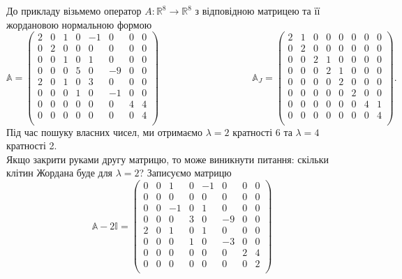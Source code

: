 \documentclass{math_library}
\begin{document}
\begin{example}
До прикладу візьмемо оператор $A \colon \mathbb{R}^8 \to \mathbb{R}^8$ з відповідною матрицею та її жордановою нормальною формою
\[
\mathbb{A} = \begin{pmatrix}
2 & 0 & 1 & 0 & -1 & 0 & 0 & 0 \\
0 & 2 & 0 & 0 & 0 & 0 & 0 & 0 \\
0 & 0 & 1 & 0 & 1 & 0 & 0 & 0 \\
0 & 0 & 0 & 5 & 0 & -9 & 0 & 0 \\
2 & 0 & 1 & 0 & 3 & 0 & 0 & 0 \\
0 & 0 & 0 & 1 & 0 & -1 & 0 & 0 \\
0 & 0 & 0 & 0 & 0 & 0 & 4 & 4 \\
0 & 0 & 0 & 0 & 0 & 0 & 0 & 4 \\
\end{pmatrix} \hspace{4cm} \mathbb{A}_J = \begin{pmatrix}
2 & 1 & 0 & 0 & 0 & 0 & 0 & 0 \\
0 & 2 & 0 & 0 & 0 & 0 & 0 & 0 \\
0 & 0 & 2 & 1 & 0 & 0 & 0 & 0 \\
0 & 0 & 0 & 2 & 1 & 0 & 0 & 0 \\
0 & 0 & 0 & 0 & 2 & 0 & 0 & 0 \\
0 & 0 & 0 & 0 & 0 & 2 & 0 & 0 \\
0 & 0 & 0 & 0 & 0 & 0 & 4 & 1 \\
0 & 0 & 0 & 0 & 0 & 0 & 0 & 4 \\
\end{pmatrix}.
\]
Під час пошуку власних чисел, ми отримаємо $\lambda = 2$ кратності 6 та $\lambda = 4$ кратності 2.\\
Якщо закрити руками другу матрицю, то може виникнути питання: скільки клітин Жордана буде для $\lambda = 2$? Записуємо матрицю 
\[
\mathbb{A}-2 \mathbb{I} = \begin{pmatrix}
0 & 0 & 1 & 0 & -1 & 0 & 0 & 0 \\
0 & 0 & 0 & 0 & 0 & 0 & 0 & 0 \\
0 & 0 & -1 & 0 & 1 & 0 & 0 & 0 \\
0 & 0 & 0 & 3 & 0 & -9 & 0 & 0 \\
2 & 0 & 1 & 0 & 1 & 0 & 0 & 0 \\
0 & 0 & 0 & 1 & 0 & -3 & 0 & 0 \\
0 & 0 & 0 & 0 & 0 & 0 & 2 & 4 \\
0 & 0 & 0 & 0 & 0 & 0 & 0 & 2 \\

\end{pmatrix}\]
\end{example}
\end{document}
